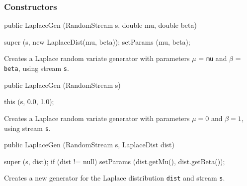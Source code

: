 \subsubsection* {Constructors}
\begin{code}

   public LaplaceGen (RandomStream s, double mu, double beta) \begin{hide} {
      super (s, new LaplaceDist(mu, beta));
      setParams (mu, beta);
   }\end{hide}
\end{code} 
\begin{tabb}  Creates a Laplace random variate generator with parameters
  $\mu$ = \texttt{mu} and $\beta$ = \texttt{beta}, using stream \texttt{s}. 
\end{tabb}
\begin{code}

   public LaplaceGen (RandomStream s) \begin{hide} {
      this (s, 0.0, 1.0);
   }\end{hide}
\end{code} 
\begin{tabb}  Creates a Laplace random variate generator with parameters
  $\mu = 0$ and $\beta = 1$, using stream \texttt{s}. 
\end{tabb}
\begin{code}
   
   public LaplaceGen (RandomStream s, LaplaceDist dist) \begin{hide} {
      super (s, dist);
      if (dist != null)
         setParams (dist.getMu(), dist.getBeta());
   } \end{hide}
\end{code}
 \begin{tabb}  Creates a new generator for the Laplace distribution \texttt{dist}
   and stream \texttt{s}. 
 \end{tabb}

